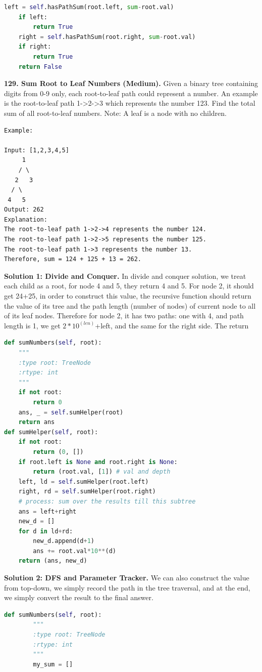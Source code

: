\documentclass[../main.tex]{subfiles}
\begin{document}
\begin{examples}[resume]
\begin{lstlisting}[language=Python]
    left = self.hasPathSum(root.left, sum-root.val)
    if left:
        return True
    right = self.hasPathSum(root.right, sum-root.val)
    if right:
        return True
    return False
\end{lstlisting}
\item \textbf{129. Sum Root to Leaf Numbers (Medium).} Given a binary tree containing digits from 0-9 only, each root-to-leaf path could represent a number. An example is the root-to-leaf path 1->2->3 which represents the number 123. Find the total sum of all root-to-leaf numbers. Note: A leaf is a node with no children.
\begin{lstlisting}[numbers=none]
Example:

Input: [1,2,3,4,5]
     1
    / \
   2   3
  / \
 4   5
Output: 262
Explanation:
The root-to-leaf path 1->2->4 represents the number 124.
The root-to-leaf path 1->2->5 represents the number 125.
The root-to-leaf path 1->3 represents the number 13.
Therefore, sum = 124 + 125 + 13 = 262.
\end{lstlisting}
\textbf{Solution 1: Divide and Conquer.} In divide and conquer solution, we treat each child as a root, for node 4 and 5, they return 4 and 5. For node 2, it should get 24+25, in order to construct this value, the recursive function should return the value of its tree and the path length (number of nodes) of current node to all of its leaf nodes. Therefore for node 2, it has two paths: one with 4, and path length is 1, we get $2*10^(len)$+left, and the same for the right side. The return
\begin{lstlisting}[language=Python]
def sumNumbers(self, root):
    """
    :type root: TreeNode
    :rtype: int
    """
    if not root:
        return 0
    ans, _ = self.sumHelper(root)
    return ans
def sumHelper(self, root):
    if not root:
        return (0, [])
    if root.left is None and root.right is None:
        return (root.val, [1]) # val and depth
    left, ld = self.sumHelper(root.left)
    right, rd = self.sumHelper(root.right)
    # process: sum over the results till this subtree
    ans = left+right
    new_d = []
    for d in ld+rd:
        new_d.append(d+1)
        ans += root.val*10**(d)
    return (ans, new_d)
\end{lstlisting}
\textbf{Solution 2: DFS and Parameter Tracker.} We can also construct the value from top-down, we simply record the path in the tree traversal, and at the end, we simply convert the result to the final answer. 
\begin{lstlisting}[language=Python]
 def sumNumbers(self, root):
        """
        :type root: TreeNode
        :rtype: int
        """
        my_sum = []
        

\end{lstlisting}
\end{examples}
\end{document}
